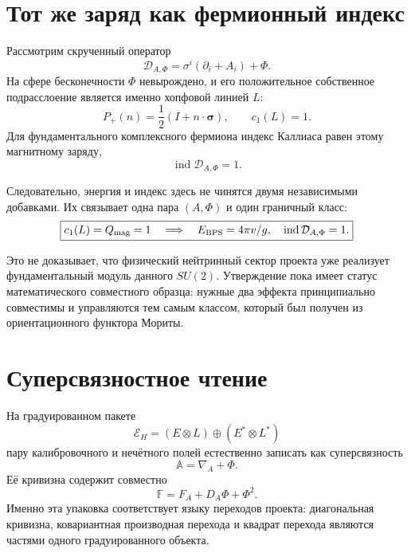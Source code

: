 \section{Тот же заряд как фермионный индекс}

Рассмотрим скрученный оператор
\begin{equation}
 \mathcal D_{A,\Phi}=\sigma^i(\partial_i+A_i)+\Phi.
 \label{eq:v5-hopf-callias-operator}
\end{equation}
На сфере бесконечности $\Phi$ невырождено, и его положительное собственное
подрасслоение является именно хопфовой линией $L$:
\begin{equation}
 P_+(n)=\frac12(I+n\cdot\boldsymbol\sigma),
 \qquad c_1(L)=1.
\end{equation}
Для фундаментального комплексного фермиона индекс Каллиаса равен этому
магнитному заряду,
\begin{equation}
 \operatorname{ind}\mathcal D_{A,\Phi}=1.
 \label{eq:v5-hopf-callias-index-one}
\end{equation}

Следовательно, энергия и индекс здесь не чинятся двумя независимыми
добавками. Их связывает одна пара $(A,\Phi)$ и один граничный класс:
\begin{equation}
 \boxed{
 c_1(L)=Q_{\rm mag}=1
 \quad\Longrightarrow\quad
 E_{\rm BPS}=4\pi v/g,
 \quad
 \operatorname{ind}\mathcal D_{A,\Phi}=1.}
 \label{eq:v5-hopf-joint-charge}
\end{equation}

Это не доказывает, что физический нейтринный сектор проекта уже реализует
фундаментальный модуль данного $SU(2)$. Утверждение пока имеет статус
математического совместного образца: нужные два эффекта принципиально
совместимы и управляются тем самым классом, который был получен из
ориентационного функтора Мориты.

\section{Суперсвязностное чтение}

На градуированном пакете
\begin{equation}
 \mathcal E_H=(E\otimes L)\oplus(E^*\otimes L^*)
\end{equation}
пару калибровочного и нечётного полей естественно записать как
суперсвязность
\begin{equation}
 \mathbb A=\nabla_A+\Phi.
\end{equation}
Её кривизна содержит совместно
\begin{equation}
 \mathbb F=F_A+D_A\Phi+\Phi^2.
 \label{eq:v5-hopf-supercurvature}
\end{equation}
Именно эта упаковка соответствует языку переходов проекта: диагональная
кривизна, ковариантная производная перехода и квадрат перехода являются
частями одного градуированного объекта.

